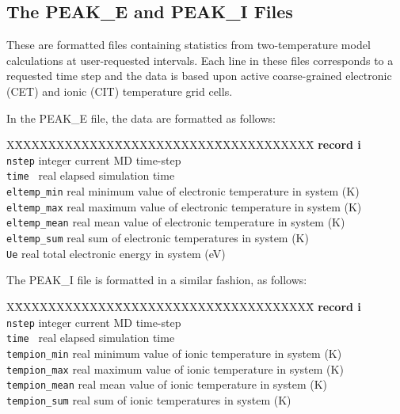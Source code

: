 \subsection{The PEAK\_E and PEAK\_I Files}
\label{peakei-files}

These are formatted files containing statistics from
 two-temperature model
calculations at user-requested intervals. Each line in these
files corresponds to a requested time step and the data is
based upon active coarse-grained electronic (CET) and
ionic (CIT) temperature grid cells.

In the PEAK\_E file, the data are formatted as follows:
\begin{tabbing}
X\=XXXXXXXXXXXX\=XXXXXXXXXXXX\=XXXXXXXXXXXX\=\kill
{\bf record i} \\
\> {\tt nstep}  \> integer \> current MD time-step \\
\> {\tt time }  \> real    \> elapsed simulation time \\
\> {\tt eltemp\_min} \> real \> minimum value of electronic temperature in system (K) \\
\> {\tt eltemp\_max} \> real \> maximum value of electronic temperature in system (K) \\
\> {\tt eltemp\_mean} \> real \> mean value of electronic temperature in system (K) \\
\> {\tt eltemp\_sum} \> real \> sum of electronic temperatures in system (K) \\
\> {\tt Ue} \> real \> total electronic energy in system (eV) \\
\end{tabbing}
The PEAK\_I file is formatted in a similar fashion, as follows:
\begin{tabbing}
X\=XXXXXXXXXXXX\=XXXXXXXXXXXX\=XXXXXXXXXXXX\=\kill
{\bf record i} \\
\> {\tt nstep}  \> integer \> current MD time-step \\
\> {\tt time }  \> real    \> elapsed simulation time \\
\> {\tt tempion\_min} \> real \> minimum value of ionic temperature in system (K) \\
\> {\tt tempion\_max} \> real \> maximum value of ionic temperature in system (K) \\
\> {\tt tempion\_mean} \> real \> mean value of ionic temperature in system (K) \\
\> {\tt tempion\_sum} \> real \> sum of ionic temperatures in system (K) \\
\end{tabbing}

